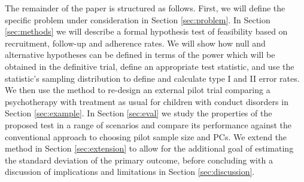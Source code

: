 \documentclass[AMA,STIX1COL]{WileyNJD-v2}
\begin{document}


The remainder of the paper is structured as follows. First, we will define the specific problem under consideration in Section \ref{sec:problem}. In Section \ref{sec:methods} we will describe a formal hypothesis test of feasibility based on recruitment, follow-up and adherence rates. We will show how null and alternative hypotheses can be defined in terms of the power which will be obtained in the definitive trial, define an appropriate test statistic, and use the statistic's sampling distribution to define and calculate type I and II error rates. We then use the method to re-design an external pilot trial comparing a psychotherapy with treatment as usual for children with conduct disorders in Section \ref{sec:example}. In Section \ref{sec:eval} we study the properties of the proposed test in a range of scenarios and compare its performance against the conventional approach to choosing pilot sample size and PCs. We extend the method in Section \ref{sec:extension} to allow for the additional goal of estimating the standard deviation of the primary outcome, before concluding with a discussion of implications and limitations in Section \ref{sec:discussion}.

\end{document}
